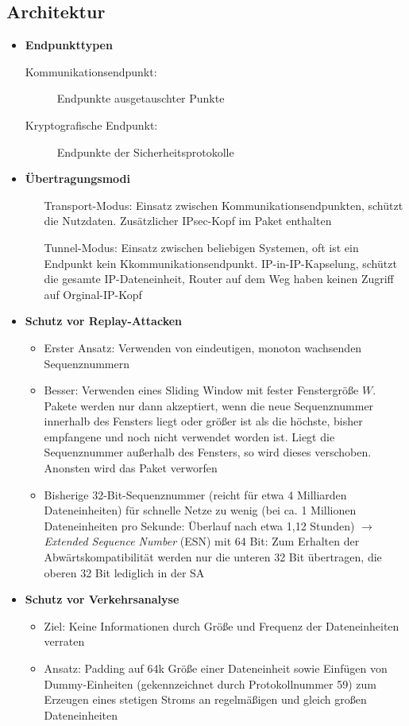 \subsection{Architektur}
\begin{itemize}
	\item \textbf{Endpunkttypen}
	\begin{description}
		\item[Kommunikationsendpunkt:]Endpunkte ausgetauschter Punkte
		\item[Kryptografische Endpunkt:] Endpunkte der Sicherheitsprotokolle
	\end{description}
	\item \textbf{Übertragungsmodi}
	\begin{itemize}
		\item[Transport-Modus:] Einsatz zwischen Kommunikationsendpunkten, schützt die Nutzdaten. Zusätzlicher IPsec-Kopf im Paket enthalten
		\item[Tunnel-Modus:] Einsatz zwischen beliebigen Systemen, oft ist ein Endpunkt kein Kkommunikationsendpunkt. IP-in-IP-Kapselung, schützt die gesamte IP-Dateneinheit, Router auf dem Weg haben keinen Zugriff auf Orginal-IP-Kopf
	\end{itemize}
	\item \textbf{Schutz vor Replay-Attacken}
	\begin{itemize}
		\item Erster Ansatz: Verwenden von eindeutigen, monoton wachsenden Sequenznummern
		\item Besser: Verwenden eines Sliding Window mit fester Fenstergröße \(W\). Pakete werden nur dann akzeptiert, wenn die neue Sequenznummer innerhalb des Fensters liegt oder größer ist als die höchste, bisher empfangene und noch nicht verwendet worden ist. Liegt die Sequenznummer außerhalb des Fensters, so wird dieses verschoben. Anonsten wird das Paket verworfen
		\item Bisherige 32-Bit-Sequenznummer (reicht für etwa 4 Milliarden Dateneinheiten) für schnelle Netze zu wenig (bei ca. 1 Millionen Dateneinheiten pro Sekunde: Überlauf nach etwa 1,12 Stunden) \(\rightarrow\) \textit{Extended Sequence Number} (ESN) mit 64 Bit: Zum Erhalten der Abwärtskompatibilität werden nur die unteren 32 Bit übertragen, die oberen 32 Bit lediglich in der SA 
	\end{itemize}
	\item \textbf{Schutz vor Verkehrsanalyse}
	\begin{itemize}
		\item Ziel: Keine Informationen durch Größe und Frequenz der Dateneinheiten verraten
		\item Ansatz: Padding auf 64k Größe einer Dateneinheit sowie Einfügen von Dummy-Einheiten (gekennzeichnet durch Protokollnummer 59) zum Erzeugen eines stetigen Stroms an regelmäßigen und gleich großen Dateneinheiten
	\end{itemize}
\end{itemize}


